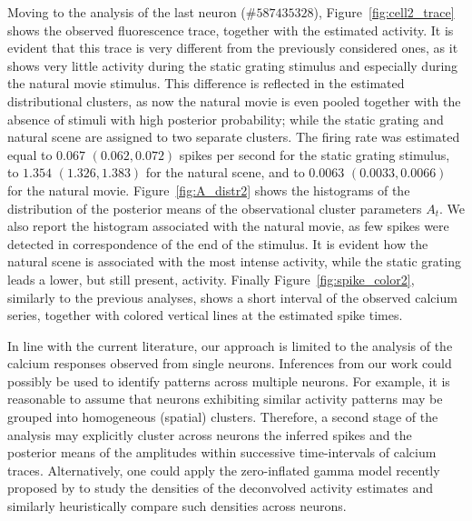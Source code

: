 Moving to the analysis of the last neuron ($\#587435328$), Figure~\ref{fig:cell2_trace} shows the observed fluorescence trace, together with the estimated activity.
It is evident that this trace is very different from the previously considered ones, as it shows very little activity during the static grating stimulus and especially during the natural movie stimulus. This difference is reflected in the estimated distributional clusters, as now the natural movie is even pooled together with the absence of stimuli with high posterior probability; while the static grating and natural scene are assigned to two separate clusters.
The firing rate was estimated equal to $0.067$ $(0.062, 0.072)$ spikes per second for the static grating stimulus, to $1.354$ $(1.326, 1.383)$ for the natural scene, and to $0.0063$ $(0.0033, 0.0066)$ for the natural movie.
Figure~\ref{fig:A_distr2} shows the histograms of the distribution of the posterior means of the observational cluster parameters $A_t$.
We also report the histogram associated with the natural movie, as few spikes were detected in correspondence of the end of the stimulus. It is evident how the natural scene is associated with the most intense activity, while the static grating leads a lower, but still present, activity. 
Finally Figure~\ref{fig:spike_color2}, similarly to the previous analyses, shows a short interval of the observed calcium series, together with colored vertical lines at the estimated spike times. 

In line with the current literature, our approach is limited to the analysis of the calcium responses observed from single neurons.
Inferences from our work could possibly be used to identify patterns across multiple neurons. For example, it is reasonable to assume that neurons exhibiting similar activity patterns may be grouped into homogeneous (spatial) clusters. Therefore, a second stage of the analysis may explicitly cluster across neurons the inferred spikes and the posterior means of the amplitudes within successive time-intervals of calcium traces. Alternatively, one could apply the zero-inflated gamma model recently proposed by \textcite{wei2019} to study the densities of the deconvolved activity estimates and similarly heuristically compare such densities across neurons. 

\newpage

